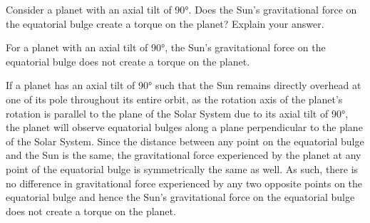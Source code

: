\documentclass[main.tex]{subfiles}
\begin{document}
\begin{q}{3}
Consider a planet with an axial tilt of \ang{90}. Does the Sun's gravitational
force on the equatorial bulge create a torque on the planet? Explain your
answer.
\end{q}

\begin{sol}
For a planet with an axial tilt of \ang{90}, the Sun's gravitational force on
the equatorial bulge does not create a torque on the planet.

\par\medskip

\noindent If a planet has an axial tilt of \ang{90} such that the Sun remains directly
overhead at one of its pole throughout its entire orbit, as the rotation axis of
the planet's rotation is parallel to the plane of the Solar System due to its
axial tilt of \ang{90}, the planet will observe equatorial bulges along a plane
perpendicular to the plane of the Solar System. Since the distance between any
point on the equatorial bulge and the Sun is the same, the gravitational force
experienced by the planet at any point of the equatorial bulge is symmetrically
the same as well. As such, there is no difference in gravitational force
experienced by any two opposite points on the equatorial bulge and hence the
Sun's gravitational force on the equatorial bulge does not create a torque on
the planet.
\end{sol}
\end{document}
